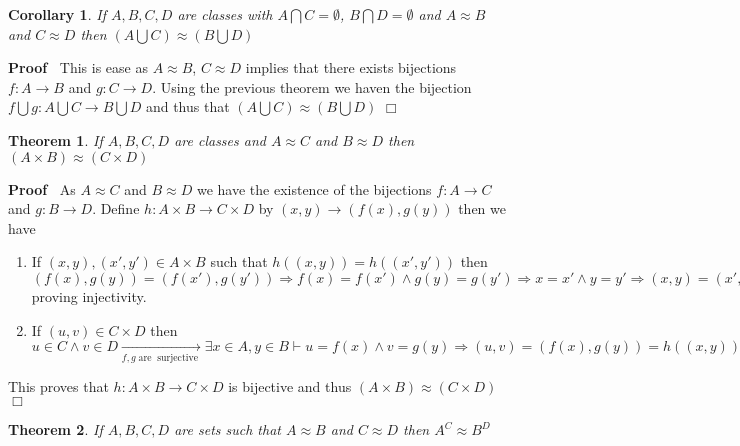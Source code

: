 \documentclass{book}
\newcommand{\Rightarrowlim}{\mathop{\rightarrow}\limits}
\newcommand{\tmop}[1]{\ensuremath{\operatorname{#1}}}
\newenvironment{proof}{\noindent\textbf{Proof\ }}{\hspace*{\fill}$\Box$\medskip}
\newtheorem{corollary}{Corollary}
\newtheorem{theorem}{Theorem}
\begin{document}
{{\begin{corollary}
  \label{union and equipotency}If $A, B, C, D$ are classes with $A \bigcap C =
  \emptyset$, $B \bigcap D = \emptyset$ and $A \approx B$ and $C \approx D$
  then $\left( A \bigcup C \right) \approx \left( B \bigcup D \right)$
\end{corollary}

\begin{proof}
  This is ease as $A \approx B$, $C \approx D$ implies that there exists
  bijections $f : A \rightarrow B$ and $g : C \rightarrow D$. Using the
  previous theorem we haven the bijection $f \bigcup g : A \bigcup C
  \rightarrow B \bigcup D$ and thus that $\left( A \bigcup C \right) \approx
  \left( B \bigcup D \right)$
\end{proof}

\begin{theorem}
  \label{product of classes and equipotence}If $A, B, C, D$ are classes and $A
  \approx C$ and $B \approx D$ then $(A \times B) \approx (C \times D)$
\end{theorem}

\begin{proof}
  As $A \approx C$ and $B \approx D$ we have the existence of the bijections
  $f : A \rightarrow C$ and $g : B \rightarrow D$. Define $h : A \times B
  \rightarrow C \times D$ by $(x, y) \rightarrow (f (x), g (y))$ then we have
  \begin{enumerate}
    \item If $(x, y), (x', y') \in A \times B$ such that $h ((x, y)) = h ((x',
    y'))$ then $(f (x), g (y)) = (f (x'), g (y')) \Rightarrow f (x) = f (x')
    \wedge g (y) = g (y') \Rightarrow x = x' \wedge y = y' \Rightarrow (x, y)
    = (x', y')$ proving injectivity.
    
    \item If $(u, v) \in C \times D$ then $u \in C \wedge v \in D
    \Rightarrowlim_{f, g \tmop{are} \tmop{surjective}} \exists x \in A, y \in
    B \vdash u = f (x) \wedge v = g (y) \Rightarrow (u, v) = (f (x), g (y)) =
    h ((x, y))$
  \end{enumerate}
  This proves that $h : A \times B \rightarrow C \times D$ is bijective and
  thus $(A \times B) \approx (C \times D)$
\end{proof}

\begin{theorem}
  If $A, B, C, D$ are sets such that $A \approx B$ and $C \approx D$ then $A^C
  \approx B^D$
\end{theorem}

}}
\end{document}
